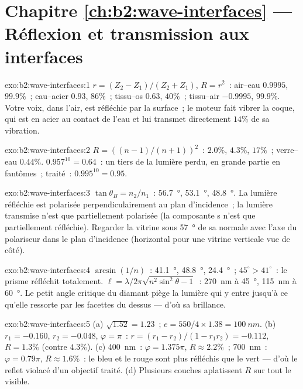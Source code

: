 \section*{Chapitre \ref{ch:b2:wave-interfaces} --- Réflexion et transmission aux interfaces}

\begin{solution}{exo:b2:wave-interfaces:1}
$r = (Z_2 - Z_1)/(Z_2 + Z_1)$, $R = r^2$~: air--eau $0.9995$, $99.9\%$~;
eau--acier $0.93$, $86\%$~; tissu--os $0.63$, $40\%$~; tissu--air
$-0.9995$, $99.9\%$. Votre voix, dans l'air, est réfléchie par la surface~; le
moteur fait vibrer la coque, qui est en acier au contact de l'eau et
lui transmet directement $14\%$ de sa vibration.
\end{solution}

\begin{solution}{exo:b2:wave-interfaces:2}
$R = ((n - 1)/(n + 1))^2$~: $2.0\%$, $4.3\%$, $17\%$~; verre--eau $0.44\%$.
$0.957^{10} = 0.64$~: un tiers de la lumière perdu, en grande partie en fantômes~;
traité~: $0.995^{10} = 0.95$.
\end{solution}

\begin{solution}{exo:b2:wave-interfaces:3}
$\tan\theta_B = n_2/n_1$~: \qty{56.7}{\degree}, \qty{53.1}{\degree}, \qty{48.8}{\degree}. La
lumière réfléchie est polarisée perpendiculairement au plan d'incidence~;
la lumière transmise n'est que partiellement polarisée (la composante s n'est
que partiellement réfléchie). Regarder la vitrine sous \qty{57}{\degree} de sa
normale avec l'axe du polariseur dans le plan d'incidence (horizontal
pour une vitrine verticale vue de côté).
\end{solution}

\begin{solution}{exo:b2:wave-interfaces:4}
$\arcsin(1/n)$~: \qty{41.1}{\degree}, \qty{48.8}{\degree}, \qty{24.4}{\degree}~; $45^\circ > 41^\circ$~:
le prisme réfléchit totalement. $\ell = \lambda/2\pi\sqrt{n^2\sin^2\theta - 1}$~: \qty{270}{nm}
à \qty{45}{\degree}, \qty{115}{nm} à \qty{60}{\degree}. Le petit angle critique du diamant
piège la lumière qui y entre jusqu'à ce qu'elle ressorte par les facettes du dessus ---
d'où sa brillance.
\end{solution}

\begin{solution}{exo:b2:wave-interfaces:5}
(a) $\sqrt{1.52} = 1.23$~; $e = 550/4 \times 1.38 = \qty{100}{nm}$. (b) $r_1 = -0.160$, $r_2 =
-0.048$, $\varphi = \pi$~: $r = (r_1 - r_2)/(1 - r_1r_2) = -0.112$, $R = 1.3\%$ (contre
$4.3\%$). (c) \qty{400}{nm}~: $\varphi = 1.375\pi$, $R \approx 2.2\%$~; \qty{700}{nm}~: $\varphi =
0.79\pi$, $R \approx 1.6\%$~: le bleu et le rouge sont plus réfléchis que le vert ---
d'où le reflet violacé d'un objectif traité. (d) Plusieurs couches aplatissent $R$
sur tout le visible.
\end{solution}

